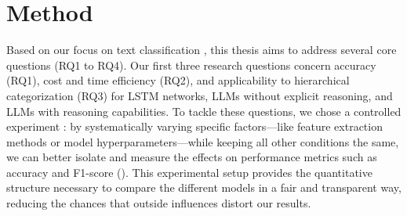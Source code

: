 \section{Method}
%
%
%
\begin{comment}
In our work on text classification, it was important to directly measure how changes in our methodological factors factors (independent variables) influenced performance metrics (dependent variables). Our primary focus was to assess the relative effectiveness of different model classes --- long short-term memory machine learning algorithms, non-reasoning large language models (LLM), and reasoning-enabled LLMs --- in classifying unstructured text data. That is why we chose a controlled experiment --- as it let us tweak one or more factors (for example, feature extraction or model parameters) while keeping all other conditions the same. This controlled setting made it easier to observe and measure the impact on key performance indicators, like classification accuracy or F1-score, using statistical tests. Because we obtained numerical measurements from our experiments, our approach is inherently quantitative.
Wohlin et al. \cite{wohlin2000software} explain that controlled experiments provide a clear way to investigate cause-and-effect relationships. Compared to surveys or case studies --- which may mix in effects from uncontrolled factors --- a controlled experiment minimizes external influences. This allows us to be more confident that any changes in the performance of our text classification system are due to the specific modifications we introduced rather than random variation.
\end{comment}

Based on our focus on text classification , this thesis aims to address several core questions (RQ1 to RQ4). Our first three research questions concern accuracy (RQ1), cost and time efficiency (RQ2), and applicability to hierarchical categorization (RQ3) for LSTM networks, LLMs without explicit reasoning, and LLMs with reasoning capabilities. To tackle these questions, we chose a controlled experiment : by systematically varying specific factors—like feature extraction methods or model hyperparameters—while keeping all other conditions the same, we can better isolate and measure the effects on performance metrics such as accuracy and F1-score (\cite{wohlin2000software}). This experimental setup provides the quantitative structure necessary to compare the different models in a fair and transparent way, reducing the chances that outside influences distort our results.

